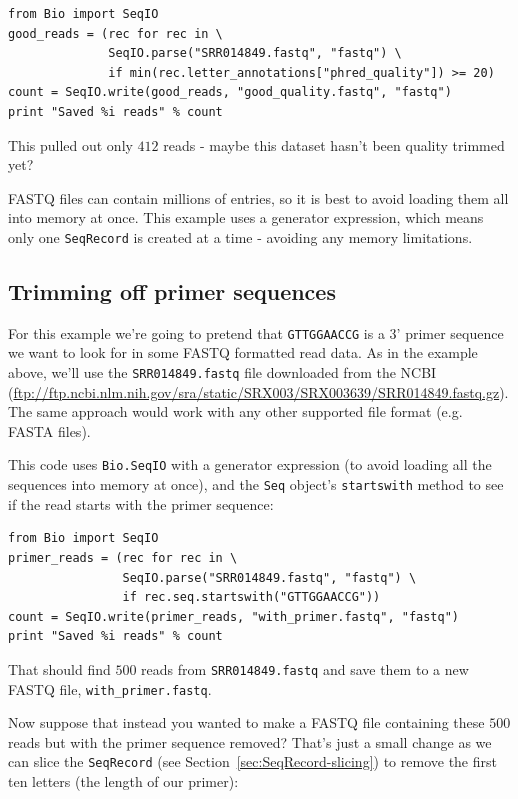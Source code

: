 \documentclass{report}
\begin{document}
\begin{verbatim}
from Bio import SeqIO
good_reads = (rec for rec in \
              SeqIO.parse("SRR014849.fastq", "fastq") \
              if min(rec.letter_annotations["phred_quality"]) >= 20)
count = SeqIO.write(good_reads, "good_quality.fastq", "fastq")
print "Saved %i reads" % count
\end{verbatim}

\noindent This pulled out only $412$ reads - maybe this dataset hasn't been
quality trimmed yet?

FASTQ files can contain millions of entries, so it is best to avoid loading
them all into memory at once.  This example uses a generator expression, which
means only one \verb|SeqRecord| is created at a time - avoiding any memory
limitations.

\subsection{Trimming off primer sequences}
\label{sec:FASTQ-slicing-off-primer}

For this example we're going to pretend that \texttt{GTTGGAACCG} is a 3' primer
sequence we want to look for in some FASTQ formatted read data.  As in the example
above, we'll use the \texttt{SRR014849.fastq} file downloaded from the NCBI
(\url{ftp://ftp.ncbi.nlm.nih.gov/sra/static/SRX003/SRX003639/SRR014849.fastq.gz}).
The same approach would work with any other supported file format (e.g. FASTA files).

This code uses \verb|Bio.SeqIO| with a generator expression (to avoid loading
all the sequences into memory at once), and the \verb|Seq| object's
\verb|startswith| method to see if the read starts with the primer sequence:

\begin{verbatim}
from Bio import SeqIO
primer_reads = (rec for rec in \
                SeqIO.parse("SRR014849.fastq", "fastq") \
                if rec.seq.startswith("GTTGGAACCG"))
count = SeqIO.write(primer_reads, "with_primer.fastq", "fastq")
print "Saved %i reads" % count
\end{verbatim}

\noindent That should find $500$ reads from \texttt{SRR014849.fastq} and save them to
a new FASTQ file, \texttt{with\_primer.fastq}.

Now suppose that instead you wanted to make a FASTQ file containing these $500$ reads
but with the primer sequence removed?  That's just a small change as we can slice the
\verb|SeqRecord| (see Section~\ref{sec:SeqRecord-slicing}) to remove the first ten
letters (the length of our primer):
\end{document}
